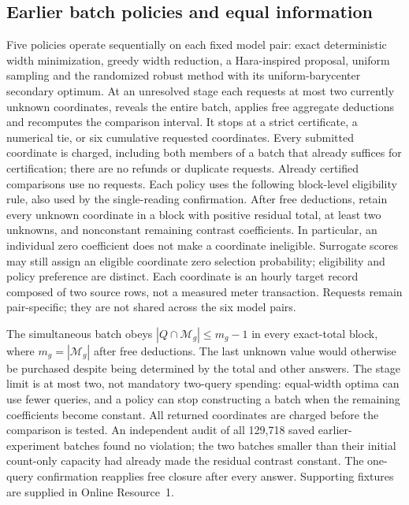 \documentclass[12pt]{article}
\begin{document}
\subsection{Earlier batch policies and equal information}\label{sec:external-policies}
Five policies operate sequentially on each fixed model pair: exact
deterministic width minimization, greedy width reduction, a Hara-inspired
proposal, uniform sampling and the randomized robust method with its
uniform-barycenter secondary optimum. At an unresolved stage each requests
at most two currently unknown coordinates, reveals the entire batch, applies
free aggregate deductions and recomputes the comparison interval. It stops
at a strict certificate, a numerical tie, or six cumulative requested
coordinates. Every submitted coordinate is charged, including both members
of a batch that already suffices for certification; there are no refunds or
duplicate requests. Already certified comparisons use no requests. Each
policy uses the following block-level eligibility rule, also used by the
single-reading confirmation. After free deductions, retain every unknown
coordinate in a block with positive residual total, at least two unknowns,
and nonconstant remaining contrast coefficients. In particular, an
individual zero coefficient does not make a coordinate ineligible.
Surrogate scores may still assign an eligible coordinate zero selection
probability; eligibility and policy preference are distinct. Each
coordinate is an hourly target record composed of two source rows, not a
measured meter transaction. Requests remain pair-specific; they are not
shared across the six model pairs.

The simultaneous batch obeys
$|Q\cap\mathcal M_g|\leq m_g-1$ in every exact-total block, where
$m_g=|\mathcal M_g|$ after free deductions. The last unknown value would
otherwise be purchased despite being determined by the total and other
answers. The stage limit is at most two, not mandatory two-query spending:
equal-width optima can use fewer queries, and a policy can stop constructing
a batch when the remaining coefficients become constant. All returned
coordinates are charged before the comparison is tested. An independent
audit of all 129,718 saved earlier-experiment batches found no violation;
the two batches smaller than their initial count-only capacity had already
made the residual contrast constant. The one-query confirmation reapplies
free closure after every answer. Supporting fixtures are supplied in
Online Resource~1.
\end{document}
